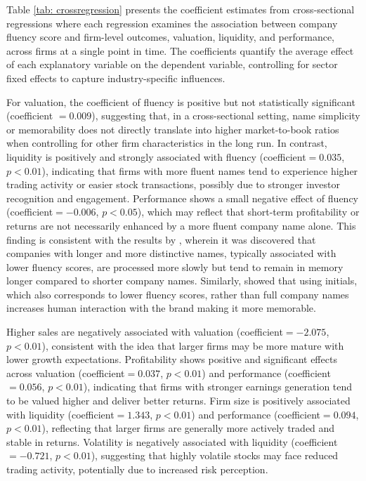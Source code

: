 \documentclass[a4paper,11pt]{report}
\begin{document}
Table \ref{tab: crossregression} presents the coefficient estimates from cross-sectional regressions where each regression examines the association between company fluency score and firm-level outcomes, valuation, liquidity, and performance, across firms at a single point in time. The coefficients quantify the average effect of each explanatory variable on the dependent variable, controlling for sector fixed effects to capture industry-specific influences.

For valuation, the coefficient of fluency is positive but not statistically significant (coefficient $= 0.009$), suggesting that, in a cross-sectional setting, name simplicity or memorability does not directly translate into higher market-to-book ratios when controlling for other firm characteristics in the long run. In contrast, liquidity is positively and strongly associated with fluency (coefficient$ = 0.035$, $p<0.01$), indicating that firms with more fluent names tend to experience higher trading activity or easier stock transactions, possibly due to stronger investor recognition and engagement. Performance shows a small negative effect of fluency (coefficient$= -0.006$, $p<0.05$), which may reflect that short-term profitability or returns are not necessarily enhanced by a more fluent company name alone. This finding is consistent with the results by , wherein it was discovered that companies with longer and more distinctive names, typically associated with lower fluency scores, are processed more slowly but tend to remain in memory longer compared to shorter company names. Similarly,  showed that using initials, which also corresponds to lower fluency scores, rather than full company names increases human interaction with the brand making it more memorable. 

Higher sales are negatively associated with valuation (coefficient$ = -2.075$, $p<0.01$), consistent with the idea that larger firms may be more mature with lower growth expectations. Profitability shows positive and significant effects across valuation (coefficient$ = 0.037$, $p<0.01$) and performance (coefficient$ = 0.056$, $p<0.01$), indicating that firms with stronger earnings generation tend to be valued higher and deliver better returns. Firm size is positively associated with liquidity (coefficient$ = 1.343$, $p<0.01$) and performance (coefficient$ = 0.094$, $p<0.01$), reflecting that larger firms are generally more actively traded and stable in returns. Volatility is negatively associated with liquidity (coefficient$ = -0.721$, $p<0.01$), suggesting that highly volatile stocks may face reduced trading activity, potentially due to increased risk perception. 
\end{document}
